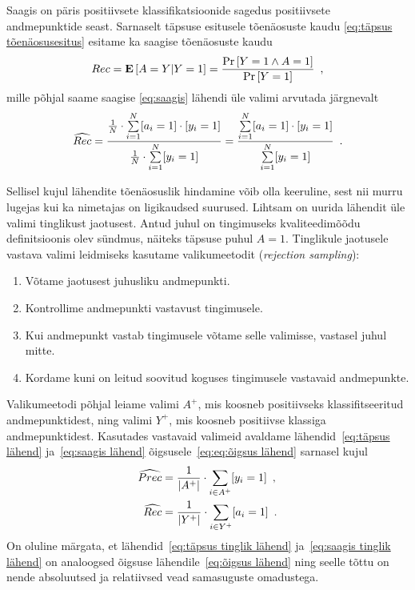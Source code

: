 Saagis on päris positiivsete klassifikatsioonide sagedus positiivsete andmepunktide seast. Sarnaselt täpsuse esitusele tõenäosuste kaudu \eqref{eq:täpsus tõenäosusesitus} esitame ka saagise tõenäosuste kaudu
\begin{equation*}
    Rec = \operatorname*{\mathbf{E}}\left[A = Y | Y = 1\right] = \frac{\Pr\left[Y = 1 \land A = 1\right]}{\Pr\left[Y = 1\right]} \enspace,
\end{equation*}
mille põhjal saame saagise \eqref{eq:saagis} lähendi üle valimi arvutada järgnevalt
\begin{equation}
    \label{eq:saagis lähend}
    \widehat{Rec} = \frac{\frac{1}{N} \cdot \sum \limits_{i = 1}^{N} [a_i = 1] \cdot [y_i = 1]}{\frac{1}{N} \cdot \sum \limits_{i = 1}^{N} [y_i = 1]} = \frac{\sum \limits_{i = 1}^{N} [a_i = 1] \cdot [y_i = 1]}{\sum \limits_{i = 1}^{N} [y_i = 1]} \enspace.
\end{equation}

Sellisel kujul lähendite tõenäosuslik hindamine võib olla keeruline, sest nii murru lugejas kui ka nimetajas on ligikaudsed suurused. Lihtsam on uurida lähendit üle valimi tinglikust jaotusest. Antud juhul on tingimuseks kvaliteedimõõdu definitsioonis olev sündmus, näiteks täpsuse puhul $A = 1$. Tinglikule jaotusele vastava valimi leidmiseks kasutame valikumeetodit (\emph{rejection sampling}):
\begin{enumerate}
    \item Võtame jaotusest juhusliku andmepunkti.
    \item Kontrollime andmepunkti vastavust tingimusele.
    \item Kui andmepunkt vastab tingimusele võtame selle valimisse, vastasel juhul mitte.
    \item Kordame kuni on leitud soovitud koguses tingimusele vastavaid andmepunkte.
\end{enumerate}

Valikumeetodi põhjal leiame valimi $A^{+}$, mis koosneb positiivseks klassifitseeritud andmepunktidest, ning valimi $Y^{+}$, mis koosneb positiivse klassiga andmepunktidest. Kasutades vastavaid valimeid avaldame lähendid~\eqref{eq:täpsus lähend} ja~\eqref{eq:saagis lähend} õigsusele~\eqref{eq:eq:õigsus lähend} sarnasel kujul
\begin{align}
    \widehat{Prec} &= \frac{1}{| A^{+} |} \cdot \sum_{i \in A^{+}} [y_i = 1] \enspace, \label{eq:täpsus tinglik lähend}\\
    \widehat{Rec} &= \frac{1}{|Y^{+}|} \cdot \sum_{i \in Y^{+}} [a_i = 1] \label{eq:saagis tinglik lähend}\enspace.
\end{align}
On oluline märgata, et lähendid~\eqref{eq:täpsus tinglik lähend} ja~\eqref{eq:saagis tinglik lähend} on analoogsed õigsuse lähendile~\eqref{eq:õigsus lähend} ning seelle tõttu on nende absoluutsed ja relatiivsed vead samasuguste omadustega.

